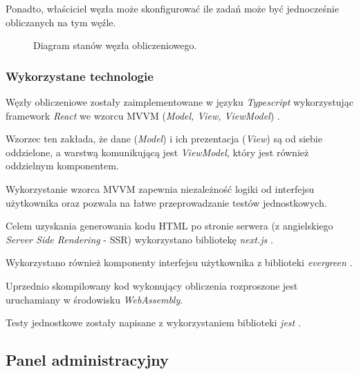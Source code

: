 \documentclass[a4paper,11pt,twoside]{report}
\theoremstyle{definition}
\begin{document}
Ponadto, właściciel węzła może skonfigurować ile zadań może być jednocześnie obliczanych na tym węźle.

\begin{figure}[ht] 
	\caption{Diagram stanów węzła obliczeniowego.}
	\label{node-state}
\end{figure}

\subsubsection{Wykorzystane technologie}
Węzły obliczeniowe zostały zaimplementowane w języku \textit{Typescript} \cite{typescript} wykorzystując framework \textit{React} \cite{react} we wzorcu MVVM (\textit{Model, View, ViewModel}) \cite{mvvm}. 

Wzorzec ten zakłada, że dane (\textit{Model}) i ich prezentacja (\textit{View}) są od siebie oddzielone, a warstwą komunikującą jest \textit{ViewModel}, który jest również oddzielnym komponentem.

Wykorzystanie wzorca MVVM zapewnia niezależność logiki od interfejsu użytkownika oraz pozwala na łatwe przeprowadzanie testów jednostkowych.

Celem uzyskania generowania kodu HTML po stronie serwera (z angielskiego \textit{Server Side Rendering} - SSR) wykorzystano bibliotekę \textit{next.js} \cite{next.js}.

Wykorzystano również komponenty interfejsu użytkownika z biblioteki \textit{evergreen} \cite{evergreen}.

Uprzednio skompilowany kod wykonujący obliczenia rozproszone jest uruchamiany w środowisku \textit{WebAssembly}.

Testy jednostkowe zostały napisane z wykorzystaniem biblioteki \textit{jest} \cite{jest}.

\subsection{Panel administracyjny}
\end{document}
